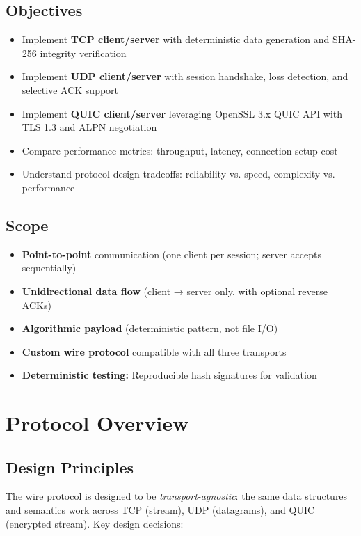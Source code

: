\documentclass[12pt,a4paper]{article}
\begin{document}
\subsection{Objectives}
\begin{itemize}
  \item Implement \textbf{TCP client/server} with deterministic data generation and SHA-256 integrity verification
  \item Implement \textbf{UDP client/server} with session handshake, loss detection, and selective ACK support
  \item Implement \textbf{QUIC client/server} leveraging OpenSSL 3.x QUIC API with TLS 1.3 and ALPN negotiation
  \item Compare performance metrics: throughput, latency, connection setup cost
  \item Understand protocol design tradeoffs: reliability vs. speed, complexity vs. performance
\end{itemize}

\subsection{Scope}
\begin{itemize}
  \item \textbf{Point-to-point} communication (one client per session; server accepts sequentially)
  \item \textbf{Unidirectional data flow} (client → server only, with optional reverse ACKs)
  \item \textbf{Algorithmic payload} (deterministic pattern, not file I/O)
  \item \textbf{Custom wire protocol} compatible with all three transports
  \item \textbf{Deterministic testing:} Reproducible hash signatures for validation
\end{itemize}

\section{Protocol Overview}
\label{sec:protocol}

\subsection{Design Principles}

The wire protocol is designed to be \textit{transport-agnostic}: the same data structures and semantics work across TCP (stream), UDP (datagrams), and QUIC (encrypted stream). Key design decisions:
\end{document}
